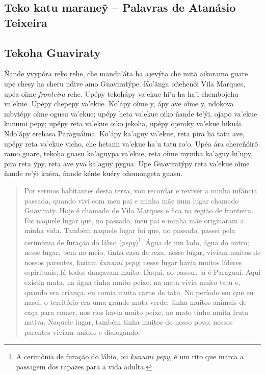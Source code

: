 \begin{itemize}
\part{Teko katu maraneỹ -- Palavras de Atanásio Teixeira}

\chapter{Tekoha Guaviraty}

Ñande yvypóra reko rehe, che mandu'áta ha ajevýta che mitã aikoramo
guare upe chesy ha cheru ndive amo Guaviratýpe. Ko'ãnga oñehenói Vila
Marques, upéa oĩme \emph{fronteira} rehe. Upépy tekohápy va'ekue hi'u ha
ha'i chembojehu va'ekue. Upépy chepepy va'ekue. Ko'ápy oĩme y, ápy ave
oĩme y, ndokova mbytépy oĩme ogusu va'ekue; upépy heta va'ekue oiko
ñande te'ýi, ojapo va'ekue kunumi pepy; upépy reta va'ekue oiko jekoha,
upépy ojeroky va'ekue hikuái. Ndo'ápy erehasa Paraguáima. Ko'ápy ka'aguy
va'ekue, reta pira ha tatu ave, upépy reta va'ekue vicho, che hetami
va'ekue ha'u tatu ro'o. Upéa ára chereñóirõ ramo guare, tekoha guasu
ka'aguypa va'ekue, reta oĩme mymba ka'aguy hi'upy, pira reta ýpy, reta
ave yva ka'aguy pygua. Upe Guaviratýpy reta va'ekue oĩme ñande re'ýi
kuéra, ñande kénte kuéry oñomongeta guasu.

\begin{quote}
Por sermos habitantes desta terra, vou recordar e reviver a minha
infância passada, quando vivi com meu pai e minha mãe num lugar chamado
Guaviraty. Hoje é chamado de Vila Marques e fica na região de fronteira.
Foi naquele lugar que, no passado, meu pai e minha mãe originaram a
minha vida. Também naquele lugar foi que, no passado, passei pela
cerimônia de furação do lábio (\emph{pepy})\footnote{A cerimônia de
  furação do lábio, ou \emph{kunumi pepy}, é um rito que marca a
  passagem dos rapazes para a vida adulta.}. Água de um lado, água do
outro; nesse lugar, bem no meio, tinha casa de reza; nesse lugar, viviam
muitos de nossos parentes, faziam \emph{kunumi pepy}; nesse lugar havia
muitos líderes espirituais; lá todos dançavam muito. Daqui, ao passar,
já é Paraguai. Aqui existia mata, na água tinha muito peixe, na mata
vivia muito tatu e, quando era criança, eu comia muita carne de tatu. No
período em que eu nasci, o território era uma grande mata verde, tinha
muitos animais de caça para comer, nos rios havia muito peixe, no mato
tinha muita fruta nativa. Naquele lugar, também tinha muitos do nosso
povo; nossos parentes viviam unidos e dialogando.
\end{quote}


\end{itemize}
